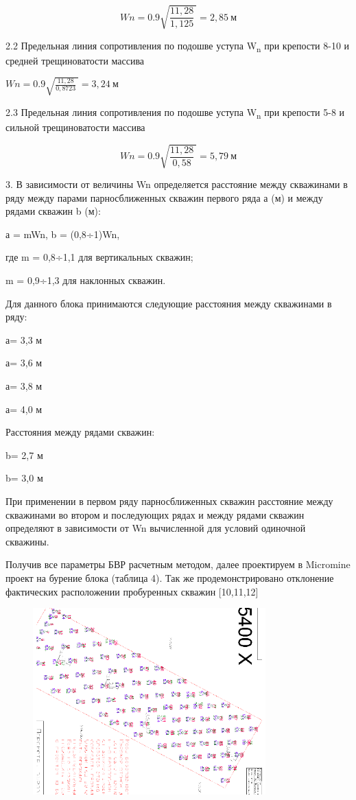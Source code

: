 \[Wn = 0.9\sqrt{\frac{11,28}{1,125}\ } = 2,85\ м\]

2.2 Предельная линия сопротивления по подошве уступа W\textsubscript{n}
при крепости 8-10 и средней трещиноватости массива

\(Wn = 0.9\sqrt{\frac{11,28}{0,8723}\ } = 3,24\ м\)

2.3 Предельная линия сопротивления по подошве уступа W\textsubscript{n}
при крепости 5-8 и сильной трещиноватости массива

\[Wn = 0.9\sqrt{\frac{11,28}{0,58}\ } = 5,79\ м\]

3. В зависимости от величины Wn определяется расстояние между скважинами
в ряду между парами парносближенных скважин первого ряда а (м) и между
рядами скважин b (м):

а = mWn, b = (0,8÷1)Wn,

где m = 0,8÷1,1 для вертикальных скважин;

m = 0,9÷1,3 для наклонных скважин.

Для данного блока принимаются следующие расстояния между скважинами в
ряду:

а= 3,3 м

а= 3,6 м

а= 3,8 м

а= 4,0 м

Расстояния между рядами скважин:

b= 2,7 м

b= 3,0 м

При применении в первом ряду парносближенных скважин расстояние между
скважинами во втором и последующих рядах и между рядами скважин
определяют в зависимости от Wn вычисленной для условий одиночной
скважины.

Получив все параметры БВР расчетным методом, далее проектируем в
Micromine проект на бурение блока (таблица 4). Так же продемонстрировано
отклонение фактических расположении пробуренных скважин {[}10,11,12{]}

\begin{figure}[H]
	\centering
	\includegraphics[width=0.8\textwidth]{media/gor/image29}
	\caption*{}
\end{figure}


